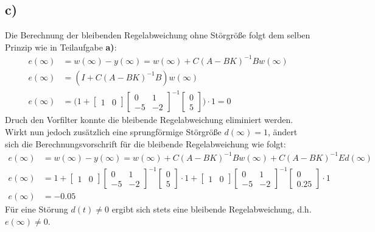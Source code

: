 \documentclass[11pt]{scrartcl} %
\begin{document}
\subsection*{c)}
Die Berechnung der bleibenden Regelabweichung ohne Störgröße folgt dem selben Prinzip wie in Teilaufgabe \textbf{a)}:
\begin{align*}
	e(\infty)&=w(\infty)-y(\infty)=w(\infty)+C(A-BK)^{-1}Bw(\infty)\\
	e(\infty)&=(I+C(A-BK)^{-1}B)w(\infty)\\
	e(\infty)&=\Biggl(1+\begin{bmatrix}1&0\end{bmatrix}\begin{bmatrix}0&1\\-5&-2\end{bmatrix}^{-1}\begin{bmatrix}0\\5\end{bmatrix}\Biggr)\cdot 1=0
\end{align*}
Druch den Vorfilter konnte die bleibende Regelabweichung eliminiert werden. Wirkt nun jedoch zusätzlich eine sprungförmige Störgröße $d(\infty)=1$, ändert sich die Berechnungsvorschrift für die bleibende Regelabweichung wie folgt:
\begin{align*}
	e(\infty)&=w(\infty)-y(\infty)=w(\infty)+C(A-BK)^{-1}Bw(\infty)+C(A-BK)^{-1}Ed(\infty)\\
	e(\infty)&=1+\begin{bmatrix}1&0\end{bmatrix}\begin{bmatrix}0&1\\-5&-2\end{bmatrix}^{-1}\begin{bmatrix}0\\5\end{bmatrix}\cdot 1+\begin{bmatrix}1&0\end{bmatrix}\begin{bmatrix}0&1\\-5&-2\end{bmatrix}^{-1}\begin{bmatrix}0\\0.25\end{bmatrix}\cdot 1\\
	e(\infty)&=-0.05
\end{align*}
Für eine Störung $d(t)\neq 0$ ergibt sich stets eine bleibende Regelabweichung, d.h. $e(\infty)\neq 0$.
\end{document}
